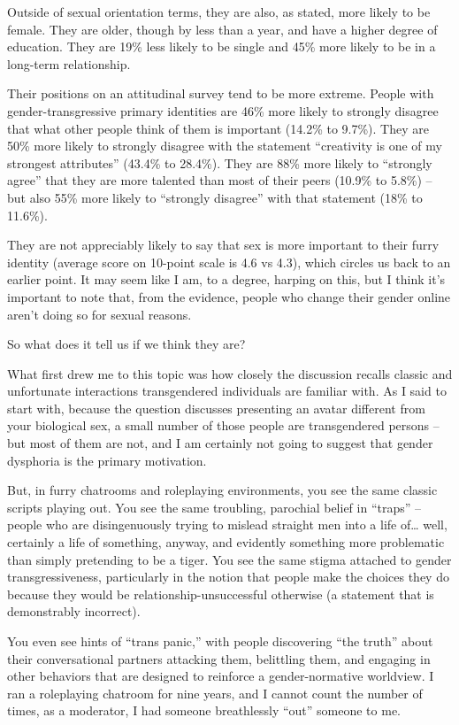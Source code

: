 Outside of sexual orientation terms, they are also, as stated, more likely to be female. They are older, though by less than a year, and have a higher degree of education. They are 19\% less likely to be single and 45\% more likely to be in a long-term relationship.

Their positions on an attitudinal survey tend to be more extreme. People with gender-transgressive primary identities are 46\% more likely to strongly disagree that what other people think of them is important (14.2\% to 9.7\%). They are 50\% more likely to strongly disagree with the statement ``creativity is one of my strongest attributes'' (43.4\% to 28.4\%). They are 88\% more likely to ``strongly agree'' that they are more talented than most of their peers (10.9\% to 5.8\%) -- but also 55\% more likely to ``strongly disagree'' with that statement (18\% to 11.6\%).

They are not appreciably likely to say that sex is more important to their furry identity (average score on 10-point scale is 4.6 vs 4.3), which circles us back to an earlier point. It may seem like I am, to a degree, harping on this, but I think it’s important to note that, from the evidence, people who change their gender online aren’t doing so for sexual reasons.

So what does it tell us if we think they are?

What first drew me to this topic was how closely the discussion recalls classic and unfortunate interactions transgendered individuals are familiar with. As I said to start with, because the question discusses presenting an avatar different from your biological sex, a small number of those people are transgendered persons -- but most of them are not, and I am certainly not going to suggest that gender dysphoria is the primary motivation.

But, in furry chatrooms and roleplaying environments, you see the same classic scripts playing out. You see the same troubling, parochial belief in ``traps'' -- people who are disingenuously trying to mislead straight men into a life of… well, certainly a life of something, anyway, and evidently something more problematic than simply pretending to be a tiger. You see the same stigma attached to gender transgressiveness, particularly in the notion that people make the choices they do because they would be relationship-unsuccessful otherwise (a statement that is demonstrably incorrect).

You even see hints of ``trans panic,'' with people discovering ``the truth'' about their conversational partners attacking them, belittling them, and engaging in other behaviors that are designed to reinforce a gender-normative worldview. I ran a roleplaying chatroom for nine years, and I cannot count the number of times, as a moderator, I had someone breathlessly ``out'' someone to me.

